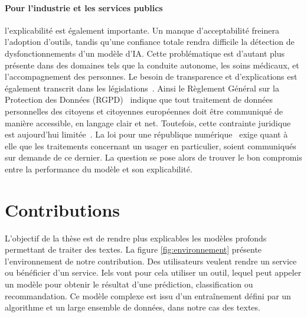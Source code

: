 \paragraph{Pour l'industrie et les services publics} l'explicabilité est également importante. Un manque d'acceptabilité freinera l'adoption d'outils, tandis qu'une confiance totale rendra difficile la détection de dysfonctionnements d'un modèle d'IA. Cette problématique est d'autant plus présente dans des domaines tels que la conduite autonome, les soins médicaux, et l'accompagnement des personnes.
Le besoin de transparence et d'explications est également transcrit dans les législations~\cite{DoshiVelez2017a,Desmoulin2019}.
Ainsi le Règlement Général sur la Protection des Données (RGPD)~\cite{Commission2018} indique que tout traitement de données personnelles des citoyens et citoyennes européennes doit être communiqué de manière accessible, en langage clair et net. Toutefois, cette contrainte juridique est aujourd'hui limitée~\cite{Wachter2017}.
La loi pour une république numérique~\cite{Legifrance2016} exige quant à elle que les traitements concernant un usager en particulier, soient communiqués sur demande de ce dernier. %
La question se pose alors de trouver le bon compromis entre la performance du modèle et son explicabilité.

\section*{Contributions}
L'objectif de la thèse est de rendre plus explicables les modèles profonds permettant de traiter des textes.
La figure \ref{fig:environnement} présente l'environnement de notre contribution. Des utilisateurs veulent rendre un service ou bénéficier d'un service. Iels vont pour cela utiliser un outil, lequel peut appeler un modèle pour obtenir le résultat d'une prédiction, classification ou recommandation. Ce modèle complexe est issu d'un entraînement défini par un algorithme et un large ensemble de données, dans notre cas des textes.

